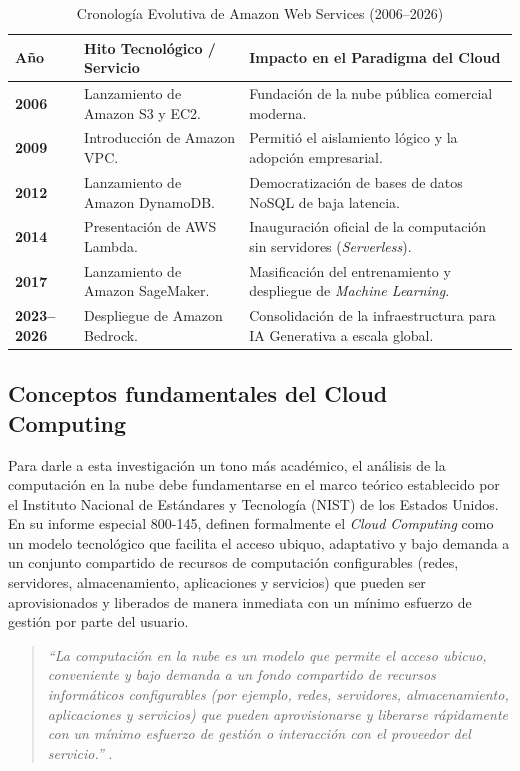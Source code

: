 \documentclass[12pt,a4paper]{article}
\begin{document}
\vspace{0.3cm}
\begin{table}[H]
\centering
\caption{Cronología Evolutiva de Amazon Web Services (2006–2026)}
\label{tab:cronologia_aws}
\begin{tabular}{ l p{5cm} p{6.5cm} }
\toprule
\textbf{Año} & \textbf{Hito Tecnológico / Servicio} & \textbf{Impacto en el Paradigma del Cloud} \\
\midrule
\textbf{2006} & Lanzamiento de Amazon S3 y EC2. & Fundación de la nube pública comercial moderna. \\
\textbf{2009} & Introducción de Amazon VPC. & Permitió el aislamiento lógico y la adopción empresarial. \\
\textbf{2012} & Lanzamiento de Amazon DynamoDB. & Democratización de bases de datos NoSQL de baja latencia. \\
\textbf{2014} & Presentación de AWS Lambda. & Inauguración oficial de la computación sin servidores (\textit{Serverless}). \\
\textbf{2017} & Lanzamiento de Amazon SageMaker. & Masificación del entrenamiento y despliegue de \textit{Machine Learning}. \\
\textbf{2023--2026} & Despliegue de Amazon Bedrock. & Consolidación de la infraestructura para IA Generativa a escala global. \\
\bottomrule
\end{tabular}
\end{table}
\vspace{0.3cm}
\subsection{Conceptos fundamentales del Cloud Computing}
Para darle a esta investigación un tono más académico, el análisis de la computación en la nube debe fundamentarse en el marco teórico establecido por el Instituto Nacional de Estándares y Tecnología (NIST) de los Estados Unidos. En su informe especial 800-145, \textcite{mell2011} definen formalmente el \textit{Cloud Computing} como un modelo tecnológico que facilita el acceso ubiquo, adaptativo y bajo demanda a un conjunto compartido de recursos de computación configurables (redes, servidores, almacenamiento, aplicaciones y servicios) que pueden ser aprovisionados y liberados de manera inmediata con un mínimo esfuerzo de gestión por parte del usuario.

\vspace{0.2cm}
\begin{quote}
\small
\textit{\enquote{La computación en la nube es un modelo que permite el acceso ubicuo, conveniente y bajo demanda a un fondo compartido de recursos informáticos configurables (por ejemplo, redes, servidores, almacenamiento, aplicaciones y servicios) que pueden aprovisionarse y liberarse rápidamente con un mínimo esfuerzo de gestión o interacción con el proveedor del servicio.}} \parencite[p.~2]{mell2011}.
\end{quote}
\vspace{0.2cm}
\end{document}
